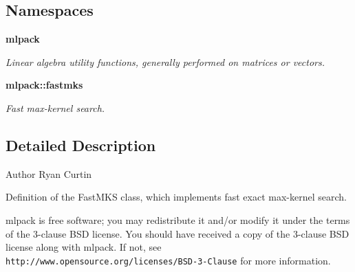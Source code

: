\subsection*{Namespaces}
\begin{DoxyCompactItemize}
\item 
 \textbf{ mlpack}
\begin{DoxyCompactList}\small\item\em Linear algebra utility functions, generally performed on matrices or vectors. \end{DoxyCompactList}\item 
 \textbf{ mlpack\+::fastmks}
\begin{DoxyCompactList}\small\item\em Fast max-\/kernel search. \end{DoxyCompactList}\end{DoxyCompactItemize}


\subsection{Detailed Description}
\begin{DoxyAuthor}{Author}
Ryan Curtin
\end{DoxyAuthor}
Definition of the Fast\+M\+KS class, which implements fast exact max-\/kernel search.

mlpack is free software; you may redistribute it and/or modify it under the terms of the 3-\/clause B\+SD license. You should have received a copy of the 3-\/clause B\+SD license along with mlpack. If not, see {\tt http\+://www.\+opensource.\+org/licenses/\+B\+S\+D-\/3-\/\+Clause} for more information. 